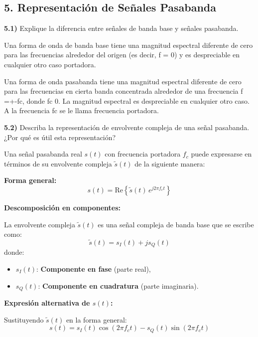 \subsection*{5. Representación de Señales Pasabanda}

\noindent \textbf{5.1)} Explique la diferencia entre señales de banda base y señales pasabanda. \par
\bigskip

    \noindent Una forma de onda de banda base tiene una magnitud espectral diferente de
    cero para las frecuencias alrededor del origen (es decir, f = 0) y es despreciable en cualquier
    otro caso portadora.\par
    \bigskip
    \noindent Una forma de onda pasabanda tiene una magnitud espectral diferente de cero
    para las frecuencias en cierta banda concentrada alrededor de una frecuencia f =+-fc, donde
    fc  0. La magnitud espectral es despreciable en cualquier otro caso. A la frecuencia fc se le
    llama frecuencia portadora.


\bigskip

\noindent \textbf{5.2)} Describa la representación de envolvente compleja de una señal pasabanda. ¿Por qué es útil esta representación? \par
\bigskip

\noindent Una señal pasabanda real \( s(t) \) con frecuencia portadora \( f_c \) puede expresarse en términos de su envolvente compleja \( \tilde{s}(t) \) de la siguiente manera:\par

\noindent \textbf{Forma general:}
\[
s(t) = \text{Re} \left\{ \tilde{s}(t) \, e^{j 2\pi f_c t} \right\}
\]

\noindent \textbf{Descomposición en componentes:}\par
\noindent La envolvente compleja \( \tilde{s}(t) \) es una señal compleja de banda base que se escribe como:
\[
\tilde{s}(t) = s_I(t) + j s_Q(t)
\]
donde:
\begin{itemize}
    \item \( s_I(t) \): \textbf{Componente en fase} (parte real),
    \item \( s_Q(t) \): \textbf{Componente en cuadratura} (parte imaginaria).
\end{itemize}

\noindent \textbf{Expresión alternativa de \( s(t) \):}\par
\noindent Sustituyendo \( \tilde{s}(t) \) en la forma general:
\[
s(t) = s_I(t) \cos(2\pi f_c t) - s_Q(t) \sin(2\pi f_c t)
\]

